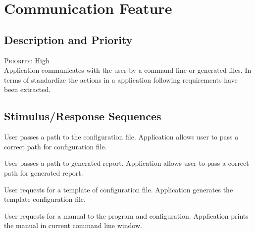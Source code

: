 \section{Communication Feature} \label{s:system-features:communication-feature}
	\begin{comment}
		$<$Don’t really say “System Feature 1.” State the feature name in just a few 
		words.$>$
	\end{comment}
\subsection*{Description and Priority}
	\begin{comment}
		$<$Provide a short description of the feature and indicate whether it is of 
		High, Medium, or Low priority. You could also include specific priority 
		component ratings, such as benefit, penalty, cost, and risk (each rated on a 
		relative scale from a low of 1 to a high of 9).$>$
	\end{comment}
	\textsc{Priority:} High \\
	Application communicates with the user by a command line or generated files. In terms of standardize the actions in a application following requirements have been extracted.
\subsection*{Stimulus/Response Sequences}
	\begin{comment}
		$<$List the sequences of user actions and system responses that stimulate the 
		behavior defined for this feature. These will correspond to the dialog elements 
		associated with use cases.$>$
	\end{comment}
	\stimresp
	{User passes a path to the configuration file.}
	{Application allows user to pass a correct path for configuration file.}
	
	\medskip
	
	\stimresp
	{User passes a path to generated report.}
	{Application allows user to pass a correct path for generated report.}
	
	\medskip
	
	\stimresp
	{User requests for a template of configuration file.}
	{Application generates the template configuration file.}
	
	\medskip
	
	\stimresp
	{User requests for a manual to the program and configuration.}
	{Application prints the manual in current command line window.}
